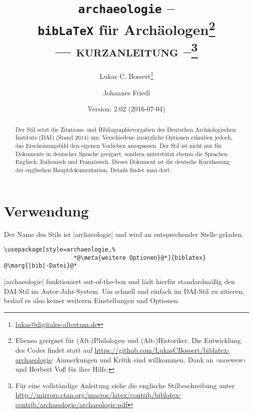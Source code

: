 \documentclass[a4paper,10pt,ngerman]{ltxdoc}
\begin{document}
 \title{\texttt{archaeologie} -- \\\texttt{bib\LaTeX} für Archäologen\footnote{Ebenso geeignet für (Alt-)Philologen und (Alt-)Historiker.
 Die Entwicklung des Codes findet statt auf \url{https://github.com/LukasCBossert/biblatex-archaeologie}: 
 Anmerkungen und Kritik sind willkommen.
 Dank an   ›moewew‹ und Herbert Voß für ihre Hilfe.
}\\ --- {\scshape kurzanleitung} --\footnote{Für eine vollständige Anleitung siehe die englische Stilbeschreibung unter \url{http://mirrors.ctan.org/macros/latex/contrib/biblatex-contrib/archaeologie/archaeologie.pdf}} }
\author{Lukas C. Bossert\thanks{\url{lukas@digitales-altertum.de}} \and Johannes Friedl}
\date{Version: 2.02 (2016-07-04)} 
 
 \maketitle
 \begin{abstract}
\noindent Der Stil setzt die Zitations- und Bibliographievorgaben des Deutschen Archäologischen Instituts (DAI) (Stand 2014) um. Verschiedene zusätzliche Optionen erlauben jedoch, das Erscheinungsbild den eigenen Vorlieben anzupassen. Der Stil ist nicht nur für Dokumente in deutscher Sprache geeignet, sondern unterstützt ebenso die Sprachen Englisch, Italienisch und Französisch. Dieses Dokument ist die deutsche Kurzfassung der englischen Hauptdokumentation, Details findet man dort.

 \end{abstract}

	{\parskip=0mm \tableofcontents}
\section{Verwendung}
   Der Name des Stils ist |archaeologie| und wird an entsprechender Stelle geladen.

\begin{lstlisting}
\usepackage[style=archaeologie,%
					*@\meta{weitere Optionen}@*]{biblatex}
@\marg{|bib|-Datei}@*
\end{lstlisting}

|archaeologie| funktioniert out-of-the-box und lädt hierfür standardmäßig den DAI-Stil im Autor-Jahr-System. 
Um schnell und einfach im DAI-Stil zu zitieren, bedarf es also keiner weiteren Einstellungen und Optionen. 
\end{document}
